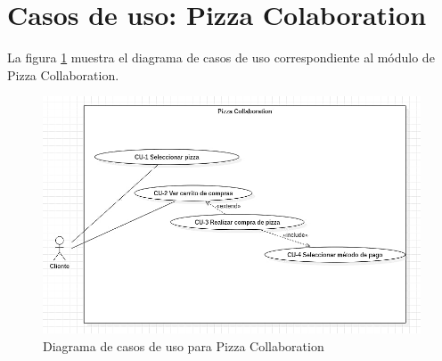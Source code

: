 

\pagebreak
\section{Casos de uso: Pizza Colaboration}

	La figura \ref{CUs:PizzaCollaboration} muestra el diagrama de casos de uso correspondiente al módulo de Pizza Collaboration.

	\begin{figure}[h]

		\begin{center}

			\includegraphics[scale=0.50]{imagenes/CUs/RegistroSolicitantes/CUs-PizzaCollaboration.png}
			\caption{Diagrama de casos de uso para Pizza Collaboration }
			\label{CUs:PizzaCollaboration}

		\end{center}
		
	\end{figure}